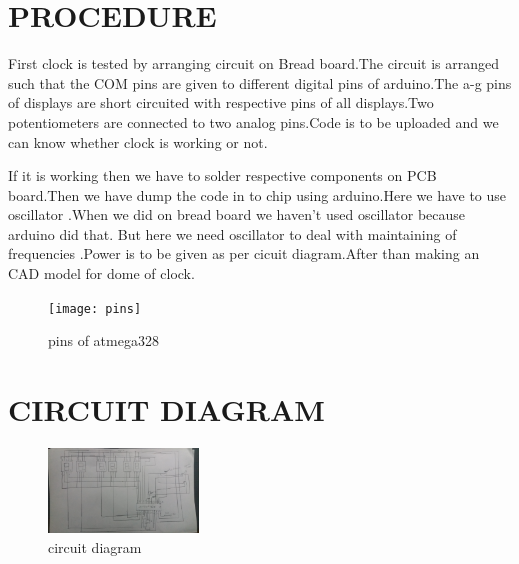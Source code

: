 \documentclass{article}
\begin{document}
\section{\textbf{PROCEDURE}}
First clock is tested by arranging circuit on Bread
board.The circuit is arranged such that the COM pins are given to different digital pins of arduino.The a-g pins of displays are short circuited with respective pins of all displays.Two potentiometers are connected to two analog pins.Code is to be uploaded and we can know whether clock is working or not.





If it is working then we have to solder respective components on PCB board.Then we have dump the code in to chip using arduino.Here we have to use oscillator .When we did on bread board we haven't used oscillator because arduino did that. But here we need oscillator to deal with maintaining of frequencies .Power is to be given as per cicuit diagram.After than making an CAD model for dome of clock.
\begin{figure}[htp]
\centering
\texttt{[image: pins]}
\caption{pins of atmega328}
\end{figure}
\section{\textbf{CIRCUIT DIAGRAM}}
\begin{figure}[htp]
\centering
\includegraphics[width=4cm]{circuit}
\caption{circuit diagram}
\label{fig:potentiometer}
\end{figure}


\pagebreak
\end{document}
